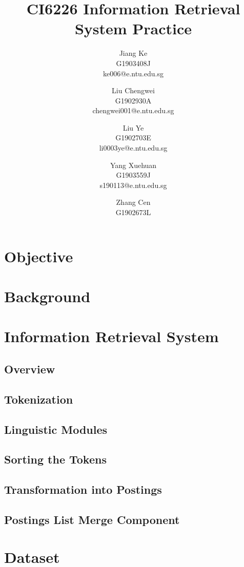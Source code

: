 \documentclass[9pt,twocolumn]{extarticle}
\title{{\huge  CI6226 Information Retrieval System Practice }}
\author{ 
Jiang Ke \\
G1903408J \\
ke006@e.ntu.edu.sg
\and Liu Chengwei \\
G1902930A \\
chengwei001@e.ntu.edu.sg
\and Liu Ye \\
G1902703E \\
li0003ye@e.ntu.edu.sg
\and Yang Xuehuan \\
G1903559J \\
s190113@e.ntu.edu.sg \\
\and Zhang Cen \\ 
G1902673L
}
\date{}
\begin{document}
\maketitle
\thispagestyle{fancy}
\section{Objective}
\section{Background}
\section{Information Retrieval System}
\subsection{Overview}

\subsection{Tokenization}
\subsection{Linguistic Modules}
\subsection{Sorting the Tokens}
\subsection{Transformation into Postings}
\subsection{Postings List Merge Component}
\section{Dataset}


{}

\end{document}
